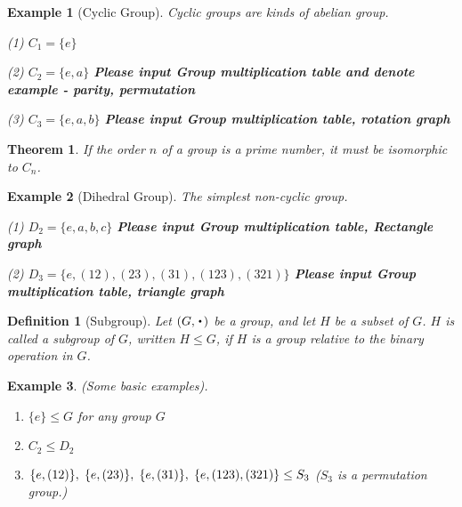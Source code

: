 \documentclass[final]{IEEEphot}
\newtheorem{definition}{Definition}[section]
\newtheorem{theorem}{Theorem}[section]
\newtheorem{example}{Example}[section]
\newcommand*{\ld}{\raisebox{-0.45ex}{\scalebox{2}{$\cdot$}}}
\newcommand{\HS}{\hspace{0.3cm}} %
\newcommand{\VS}{\vspace{0.3cm}} %
\newcommand{\Com}{,\hspace{0.1cm}} %
\newcommand{\vs}{\vspace{0.1cm}} %
\begin{document}
\vs

\begin{example}[Cyclic Group]
Cyclic groups are kinds of abelian group.

\normalfont

(1) $C_1 = \{e\}$

(2) $C_2 = \{e, a\}$ \textbf{Please input Group multiplication table and denote example - parity, permutation}

\VS
\VS
\VS

(3) $C_3 = \{e,a,b\}$ \textbf{Please input Group multiplication table, rotation graph}

\VS
\VS
\VS

\end{example}

\begin{theorem}
 If the order $n$ of a group is a prime number, it must be isomorphic to $C_n$.\footnotemark[3]
\end{theorem}
\newpage

\begin{example}[Dihedral Group]
 The simplest non-cyclic group.
 
 \normalfont
 (1) $D_2 = \{e,a,b,c\}$ \textbf{Please input Group multiplication table, Rectangle graph}
 
 \VS
 \VS
 \VS
 
 (2) $D_3 = \{e, (12), (23), (31), (123), (321)\}$ \textbf{Please input Group multiplication table, triangle graph}
 
 \VS
 \VS
 \VS
 \VS
\end{example}

\begin{definition}[Subgroup]
\normalfont
 Let $(G,\ld)$ be a group, and let $H$ be a subset of $G$. $H$ is called a subgroup of $G$, written $H\leq G$, if $H$
 is a group relative to the binary operation in $G$. \footnotemark[1]
\end{definition}

\vs

\begin{example}
(Some basic examples).

\normalfont

 \begin{enumerate}[(1)]
  \item $\{e\} \leq G$ for any group $G$
  \item $C_2 \leq D_2 $
  \item $\{e,(12)\}\Com \{e,(23)\}\Com \{e,(31)\}\Com \{e,(123),(321)\} \leq S_3$ \HS ($S_3$ is a permutation group.)
 \end{enumerate}

\end{example}
\end{document}

